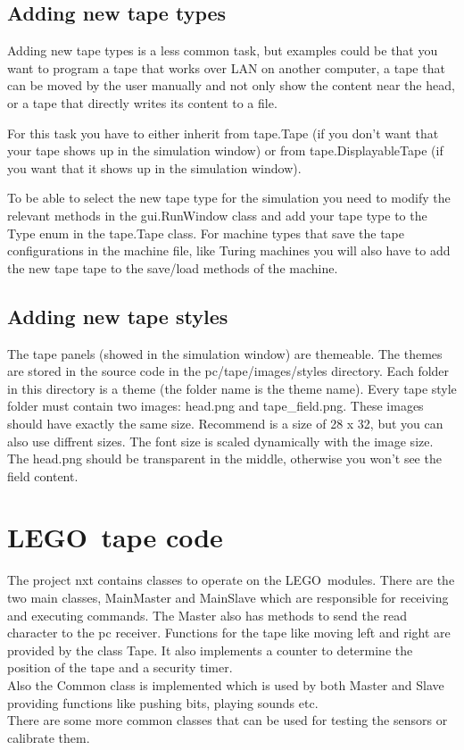 \documentclass[%
  a4paper,%
  11pt,%
  blue,%
  hyperref	%
  ]{tubsartcl}
\begin{document}
\subsection{Adding new tape types}

Adding new tape types is a less common task, but examples could be that you want to program a tape that works over LAN on another computer, a tape that can be moved by the user manually and not only show the content near the head, or a tape that directly writes its content to a file.

For this task you have to either inherit from tape.Tape (if you don't want that your tape shows up in the simulation window) or from tape.DisplayableTape (if you want that it shows up in the simulation window). 

To be able to select the new tape type for the simulation you need to modify the relevant methods in the gui.RunWindow class and add your tape type to the Type enum in the tape.Tape class. For machine types that save the tape configurations in the machine file, like Turing machines you will also have to add the new tape tape to the save/load methods of the machine.

\subsection{Adding new tape styles}
\label{sec:adding-new-tape}

The tape panels (showed in the simulation window) are themeable. The themes are stored in the source code in the pc/tape/images/styles directory. Each folder in this directory is a theme (the folder name is the theme name). Every tape style folder must contain two images: head.png and tape\_field.png. These images should have exactly the same size. Recommend is a size of 28 x 32, but you can also use diffrent sizes. The font size is scaled dynamically with the image size. The head.png should be transparent in the middle, otherwise you won't see the field content.


\section{LEGO\textregistered\, tape code}
\label{sec:lego}

The project nxt contains classes to operate on the LEGO\textregistered\, modules. There are the two main classes, MainMaster and MainSlave which are responsible for receiving and executing commands. The Master also has methods to send the read character to the pc receiver. Functions for the tape like moving left and right are provided by the class Tape. It also implements a counter to determine the position of the tape and a security timer. \\
Also the Common class is implemented which is used by both Master and Slave providing functions like pushing bits, playing sounds etc.\\
There are some more common classes that can be used for testing the sensors or calibrate them.
\end{document}
